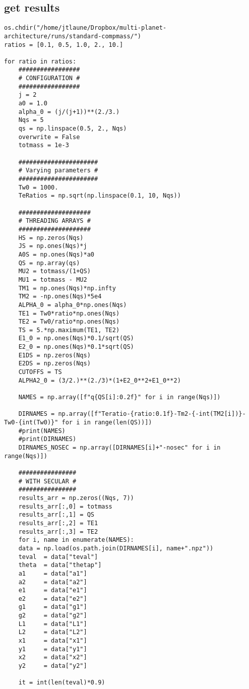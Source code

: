 \documentclass[11pt]{article}
\begin{document}
\subsection{get results}
\label{sec:orgc33ac6f}
\begin{verbatim}
os.chdir("/home/jtlaune/Dropbox/multi-planet-architecture/runs/standard-compmass/")
ratios = [0.1, 0.5, 1.0, 2., 10.]

for ratio in ratios:
    #################
    # CONFIGURATION #
    #################
    j = 2
    a0 = 1.0
    alpha_0 = (j/(j+1))**(2./3.)
    Nqs = 5
    qs = np.linspace(0.5, 2., Nqs)
    overwrite = False
    totmass = 1e-3

    ######################
    # Varying parameters #
    ######################
    Tw0 = 1000.
    TeRatios = np.sqrt(np.linspace(0.1, 10, Nqs))

    ####################
    # THREADING ARRAYS #
    ####################
    HS = np.zeros(Nqs)
    JS = np.ones(Nqs)*j
    A0S = np.ones(Nqs)*a0
    QS = np.array(qs)
    MU2 = totmass/(1+QS)
    MU1 = totmass - MU2
    TM1 = np.ones(Nqs)*np.infty
    TM2 = -np.ones(Nqs)*5e4
    ALPHA_0 = alpha_0*np.ones(Nqs)
    TE1 = Tw0*ratio*np.ones(Nqs)
    TE2 = Tw0/ratio*np.ones(Nqs)
    TS = 5.*np.maximum(TE1, TE2)
    E1_0 = np.ones(Nqs)*0.1/sqrt(QS)
    E2_0 = np.ones(Nqs)*0.1*sqrt(QS)
    E1DS = np.zeros(Nqs)
    E2DS = np.zeros(Nqs)
    CUTOFFS = TS
    ALPHA2_0 = (3/2.)**(2./3)*(1+E2_0**2+E1_0**2)

    NAMES = np.array([f"q{QS[i]:0.2f}" for i in range(Nqs)])

    DIRNAMES = np.array([f"Teratio-{ratio:0.1f}-Tm2-{-int(TM2[i])}-Tw0-{int(Tw0)}" for i in range(len(QS))])
    #print(NAMES)
    #print(DIRNAMES)
    DIRNAMES_NOSEC = np.array([DIRNAMES[i]+"-nosec" for i in range(Nqs)])

    ################
    # WITH SECULAR #
    ################
    results_arr = np.zeros((Nqs, 7))
    results_arr[:,0] = totmass
    results_arr[:,1] = QS
    results_arr[:,2] = TE1
    results_arr[:,3] = TE2
    for i, name in enumerate(NAMES):
	data = np.load(os.path.join(DIRNAMES[i], name+".npz"))
	teval  = data["teval"]
	theta  = data["thetap"]
	a1     = data["a1"]
	a2     = data["a2"]
	e1     = data["e1"]
	e2     = data["e2"]
	g1     = data["g1"]
	g2     = data["g2"]
	L1     = data["L1"]
	L2     = data["L2"]
	x1     = data["x1"]
	y1     = data["y1"]
	x2     = data["x2"]
	y2     = data["y2"]

	it = int(len(teval)*0.9)


\end{verbatim}
\end{document}
